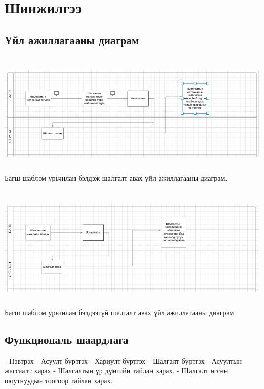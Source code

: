 
\section{Шинжилгээ }
\subsection{Үйл ажиллагааны диаграм}
\includegraphics[width=15cm,height=6cm, scale=0.5]{Figures/ac1.png}
\hspace*{0pt}\hfill Багш шаблом урьчилан бэлдэж шалгалт авах үйл ажиллагааны диаграм.
\newline
\newline

\includegraphics[width=15cm,height=6cm, scale=0.5]{Figures/ac2.png}
\hspace*{0pt}\hfill Багш шаблом урьчилан бэлдээгүй шалгалт авах үйл ажиллагааны диаграм.
\newline
\subsection{Функциональ шаардлага}
\begin{flushleft}
- Нэвтрэх
\linebreak
- Асуулт бүртгэх
\linebreak
- Хариулт бүртгэх
\linebreak
- Шалгалт бүртгэх\linebreak
- Асуултын жагсаалт харах\linebreak
- Шалгалтын үр дүнгийн тайлан харах.\linebreak
- Шалгалт өгсөн оюутнуудын тоогоор тайлан харах.\linebreak
\end{flushleft}
